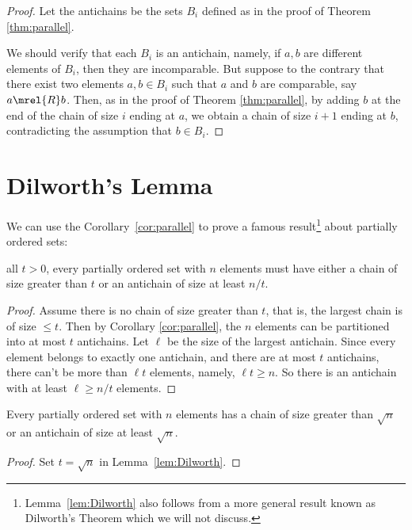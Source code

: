 \begin{proof}
Let the antichains be the sets $B_i$ defined as in the proof of Theorem
\ref{thm:parallel}.

We should verify that each $B_i$ is an antichain, namely, if $a,b$ are
different elements of $B_i$, then they are incomparable.  But suppose to
the contrary that there exist two elements $a,b \in B_i$ such that $a$ and
$b$ are comparable, say $a \mrel{R} b$.  Then, as in the proof of Theorem
\ref{thm:parallel}, by adding $b$ at the end of the chain of size $i$
ending at $a$, we obtain a chain of size $i+1$ ending at $b$,
contradicting the assumption that $b\in B_i$.
\end{proof}

\section{Dilworth's Lemma}

We can use the Corollary~\ref{cor:parallel} to prove a famous
result\footnote{Lemma~\ref{lem:Dilworth} also follows from a more general
result known as Dilworth's Theorem which we will not discuss.} about
partially ordered sets:

\begin{lemma}[Dilworth]\label{lem:Dilworth}
 all $t>0$, every partially ordered set with
$n$ elements must have either a chain of size greater than $t$ or an
antichain of size at least $n / t$.
\end{lemma}

\begin{proof}
Assume there is no chain of size greater than $t$, that is, the largest
chain is of size $\le t$.  Then by Corollary \ref{cor:parallel}, the $n$
elements can be partitioned into at most $t$ antichains.  Let $\ell$ be
the size of the largest antichain.  Since every element belongs to exactly
one antichain, and there are at most $t$ antichains, there can't be more
than $\ell t$ elements, namely, $\ell t \geq n$.  So there is an antichain
with at least $\ell \geq n / t$ elements.
\end{proof}

\begin{corollary}\label{cor:Dilworth}
Every partially ordered set with $n$ elements has a chain of size greater
than $\sqrt{n}$ or an antichain of size at least $\sqrt{n}$.

\begin{proof}
  Set $t = \sqrt{n}$ in Lemma~\ref{lem:Dilworth}.
\end{proof}
\end{corollary}

